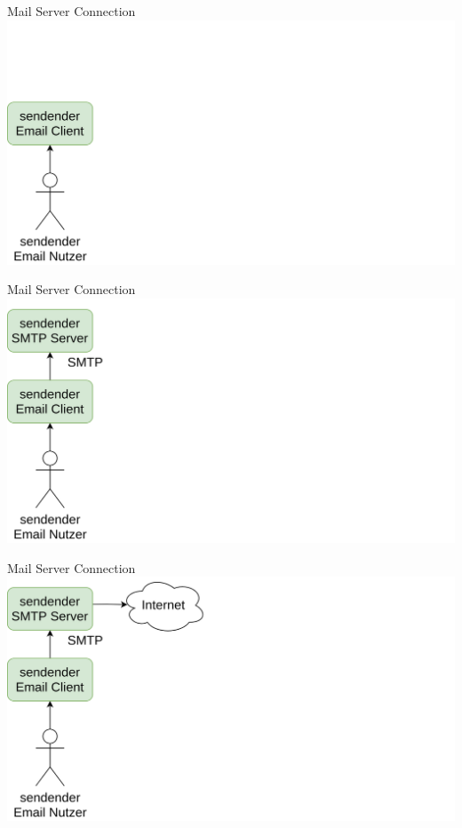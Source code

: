 \documentclass[aspectratio=169]{beamer}
\begin{document}
\begin{frame}[plain]{Mail Server Connection}
    \centering
    \includegraphics[height=.8\textheight]{media/mail-diagram-02.png}
\end{frame}

\begin{frame}[plain]{Mail Server Connection}
    \centering
    \includegraphics[height=.8\textheight]{media/mail-diagram-03.png}
\end{frame}

\begin{frame}[plain]{Mail Server Connection}
    \centering
    \includegraphics[height=.8\textheight]{media/mail-diagram-04.png}
\end{frame}
\end{document}
